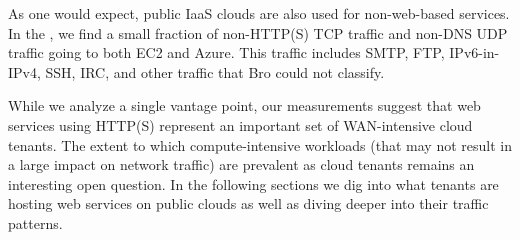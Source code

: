 As one would expect, public IaaS clouds are also used for non-web-based
services.  In the \captureonedata, we find a small fraction of non-HTTP(S)
TCP traffic and non-DNS UDP traffic going to both EC2 and Azure. 
This traffic includes SMTP, FTP, IPv6-in-IPv4, SSH, IRC, and other traffic that Bro
could not classify.


 While we analyze a single
vantage point, our measurements suggest that web
services using HTTP(S) represent an important set of WAN-intensive
cloud tenants. The extent to which compute-intensive workloads (that
may not result in a large impact on network traffic) are prevalent as
cloud tenants remains an interesting open question.  In the following
sections we dig into what tenants are hosting web services on public
clouds as well as diving deeper into their traffic patterns.


